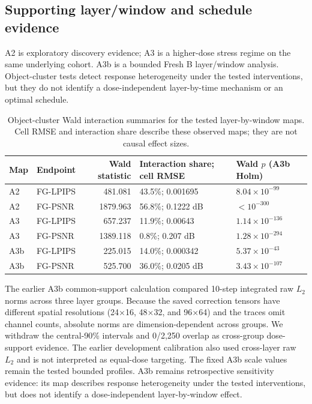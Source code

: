 \documentclass[11pt]{article}
\begin{document}
\clearpage

\subsection*{Supporting layer/window and schedule evidence}
A2 is exploratory discovery evidence; A3 is a higher-dose stress regime on the same underlying cohort. A3b is a bounded Fresh B layer/window analysis. Object-cluster tests detect response heterogeneity under the tested interventions, but they do not identify a dose-independent layer-by-time mechanism or an optimal schedule.

\begin{table}[ht]
\centering\small
\caption{Object-cluster Wald interaction summaries for the tested layer-by-window maps. Cell RMSE and interaction share describe these observed maps; they are not causal effect sizes.}\label{tab:supp-layerwindow}
\begin{tabular}{lp{2.1cm}rp{4.2cm}p{2.6cm}}\toprule Map & Endpoint & Wald statistic & Interaction share; cell RMSE & Wald $p$ (A3b Holm) \\\midrule
A2 & FG-LPIPS & 481.081 & 43.5\%; 0.001695 & $8.04\times10^{-99}$ \\
A2 & FG-PSNR & 1879.963 & 56.8\%; 0.1222 dB & $<10^{-300}$ \\
A3 & FG-LPIPS & 657.237 & 11.9\%; 0.00643 & $1.14\times10^{-136}$ \\
A3 & FG-PSNR & 1389.118 & 0.8\%; 0.207 dB & $1.28\times10^{-294}$ \\
A3b & FG-LPIPS & 225.015 & 14.0\%; 0.000342 & $5.37\times10^{-43}$ \\
A3b & FG-PSNR & 525.700 & 36.0\%; 0.0205 dB & $3.43\times10^{-107}$ \\
\bottomrule\end{tabular}
\end{table}

The earlier A3b common-support calculation compared 10-step integrated raw $L_2$ norms across three layer groups. Because the saved correction tensors have different spatial resolutions (24$\times$16, 48$\times$32, and 96$\times$64) and the traces omit channel counts, absolute norms are dimension-dependent across groups. We withdraw the central-90\% intervals and 0/2,250 overlap as cross-group dose-support evidence. The earlier development calibration also used cross-layer raw $L_2$ and is not interpreted as equal-dose targeting. The fixed A3b scale values remain the tested bounded profiles. A3b remains retrospective sensitivity evidence: its map describes response heterogeneity under the tested interventions, but does not identify a dose-independent layer-by-window effect.
\end{document}
